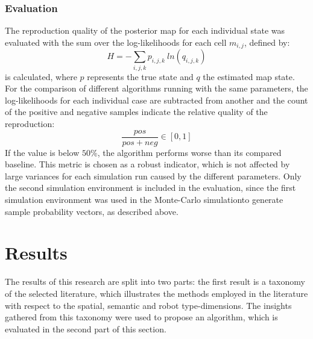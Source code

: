 \documentclass[twocolumn,letterpaper]{IEEEAerospaceCLS}  %
\begin{document}
\subsubsection{Evaluation}\label{ssec:MetEval}
The reproduction quality of the posterior map for each individual state was evaluated with the sum over the log-likelihoods for each cell $m_{i,j}$, defined by:
\begin{equation} \label{eq:Entropy}
    H = - \sum_{i,j,k} p_{i,j,k}~ln(q_{i,j,k})
\end{equation}
is calculated, where $p$ represents the true state and $q$ the estimated map state.\\
For the comparison of different algorithms running with the same parameters, the log-likelihoods for each individual case are subtracted from another and the count of the positive and negative samples indicate the relative quality of the reproduction:
\begin{equation} \label{eq:eval}
    \frac{pos}{pos+neg} \in [0, 1]
\end{equation} If the value is below $50$\%, the algorithm performs worse than its compared baseline. This metric is chosen as a robust indicator, which is not affected by large variances for each simulation run caused by the different parameters. 
Only the second simulation environment is included in the evaluation, since the first simulation environment was used in the Monte-Carlo simulationto generate sample probability vectors, as described above.
\section{Results} \label{sec:Res}
The results of this research are split into two parts: the first result is a taxonomy of the selected literature, which illustrates the methods employed in the literature with respect to the spatial, semantic and robot type-dimensions. The insights gathered from this taxonomy were used to propose an algorithm, which is evaluated in the second part of this section.
\end{document}
